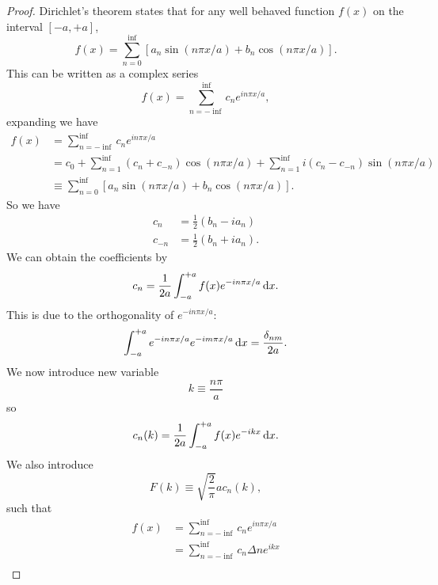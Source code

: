 \begin{proof}
Dirichlet's theorem states that for any well behaved function $f(x)$ on the interval $[-a,+a]$,
\begin{equation}
f(x)=\sum_{n=0}^{\inf}[a_n\sin(n\pi x/a)+b_n\cos(n\pi x/a)].
\end{equation}
This can be written as a complex series
\begin{equation}
f(x)=\sum_{n=-\inf}^{\inf}c_ne^{in\pi x/a}, 
\end{equation}
expanding we have
\begin{subequations}
\begin{align}
f(x)&=\sum_{n=-\inf}^{\inf}c_ne^{in\pi x/a} \\
&=c_0+\sum_{n=1}^{\inf}(c_n+c_{-n})\cos(n\pi x/a)+\sum_{n=1}^{\inf}i(c_n-c_{-n})\sin(n\pi x/a)\\
&\equiv\sum_{n=0}^{\inf}[a_n\sin(n\pi x/a)+b_n\cos(n\pi x/a)].
\end{align}
\end{subequations}
So we have
\begin{subequations}
\begin{align}
c_n&=\frac{1}{2}(b_n-ia_n)\\
c_{-n}&=\frac{1}{2}(b_n+ia_n).
\end{align}
\end{subequations}
We can obtain the coefficients by 
\begin{equation}
c_n=\frac{1}{2a}\int^{+a}_{-a}f(x)e^{-in\pi x/a}\dx.
\end{equation}
This is due to the orthogonality of $e^{-in\pi x/a}$:
\begin{equation}
\int^{+a}_{-a}e^{-in\pi x/a}e^{-im\pi x/a}\dx=\frac{\delta_{nm}}{2a}.
\end{equation}
We now introduce new variable 
\begin{equation}
k\equiv\frac{n\pi}{a}
\end{equation}
so 
\begin{equation}
c_n(k)=\frac{1}{2a}\int^{+a}_{-a}f(x)e^{-ikx}\dx.
\end{equation}
We also introduce
\begin{equation}
F(k)\equiv\sqrt{\frac{2}{\pi}}ac_n(k), 
\end{equation}
such that
\begin{subequations}
\begin{align}
f(x)&=\sum_{n=-\inf}^{\inf}c_ne^{in\pi x/a}\\
&=\sum_{n=-\inf}^{\inf}c_n\Delta ne^{ikx}\\

\end{align}
\end{subequations}
\end{proof}
